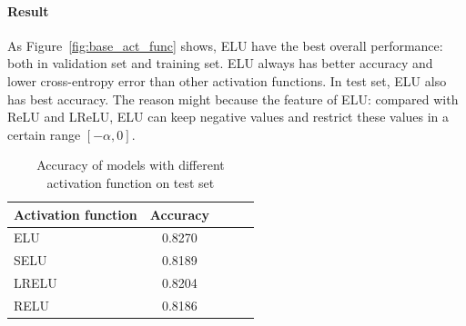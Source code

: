 \documentclass{article}
\begin{document}
\paragraph{Result}
As Figure~\ref{fig:base_act_func} shows, ELU have the best overall performance: both in validation set and training set. ELU always has better accuracy and lower cross-entropy error than other activation functions. In test set, ELU also has best accuracy. The reason might because the feature of ELU: compared with ReLU and LReLU, ELU can keep negative values and restrict these values in a certain range $[ -\alpha , 0 ]$. 


\begin{table}[tb]
\vskip 3mm
\begin{center}
\begin{small}
\begin{sc}
\begin{tabular}{lcccr}
\hline
\abovespace\belowspace
Activation function & Accuracy \\
\hline
\abovespace
ELU    	& 0.8270 	\\
SELU 	& 0.8189 	\\
LRELU  	& 0.8204 	\\
RELU	& 0.8186	\\

\hline
\end{tabular}
\end{sc}
\end{small}
\caption{Accuracy of models with different activation function on test set}
\label{tab:activation_func}
\end{center}
\vskip -3mm
\end{table}
\end{document}
